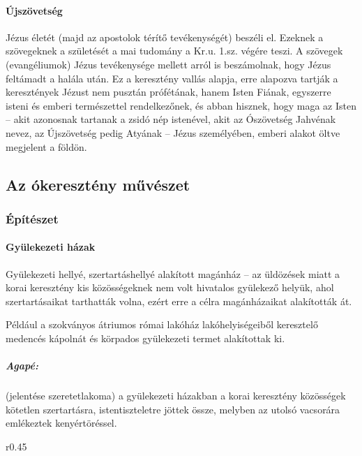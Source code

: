\paragraph{Újszövetség}
Jézus életét (majd az apostolok térítő tevékenységét) beszéli el. Ezeknek a szövegeknek a születését a mai tudomány a Kr.u. 1.sz. végére teszi. A szövegek (evangéliumok) Jézus tevékenysége mellett arról is beszámolnak, hogy Jézus feltámadt a halála után. Ez a keresztény vallás alapja, erre alapozva tartják a keresztények Jézust nem pusztán prófétának, hanem Isten Fiának, egyszerre isteni és emberi természettel rendelkezőnek, és abban hisznek, hogy maga az Isten – akit azonosnak tartanak a zsidó nép istenével, akit az Ószövetség Jahvénak nevez, az Újszövetség pedig Atyának – Jézus személyében, emberi alakot öltve megjelent a földön.

\subsection*{Az ókeresztény művészet}

\subsubsection{Építészet}

	\paragraph{Gyülekezeti házak}
	Gyülekezeti hellyé, szertartáshellyé alakított magánház – az üldözések miatt a korai keresztény kis közösségeknek nem volt hivatalos gyülekező helyük, ahol szertartásaikat tarthatták volna, ezért erre a célra magánházaikat alakították át.
	
	Például a szokványos átriumos római lakóház lakóhelyiségeiből keresztelő medencés kápolnát és körpados gyülekezeti termet alakítottak ki.
	
	\subparagraph{Agapé:} (jelentése szeretetlakoma) a gyülekezeti házakban a korai keresztény közösségek kötetlen szertartásra, istentiszteletre jöttek össze, melyben az utolsó vacsorára emlékeztek kenyértöréssel.
	
	\begin{wrapfigure}{r}{0.45\textwidth}
	\end{wrapfigure}
	

